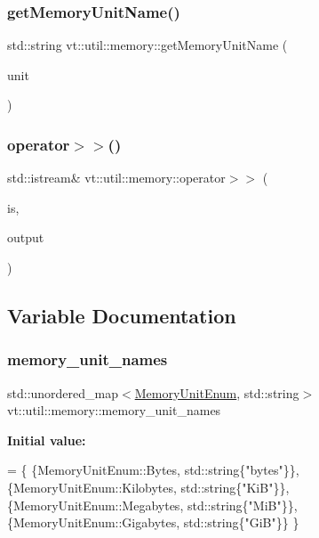 \subsubsection{\texorpdfstring{get\+Memory\+Unit\+Name()}{getMemoryUnitName()}}
{\footnotesize\ttfamily std\+::string vt\+::util\+::memory\+::get\+Memory\+Unit\+Name (\begin{DoxyParamCaption}\item[{\hyperlink{namespacevt_1_1util_1_1memory_a64df3d84293b34009f78e2a1db2f9bb6}{Memory\+Unit\+Enum}}]{unit }\end{DoxyParamCaption})}

\mbox{\label{namespacevt_1_1util_1_1memory_afe1acbbca9aa1bd7310548cefd40045c}} 
\subsubsection{\texorpdfstring{operator$>$$>$()}{operator>>()}}
{\footnotesize\ttfamily std\+::istream\& vt\+::util\+::memory\+::operator$>$$>$ (\begin{DoxyParamCaption}\item[{std\+::istream \&}]{is,  }\item[{\hyperlink{structvt_1_1util_1_1memory_1_1_comma_delimit}{Comma\+Delimit} \&}]{output }\end{DoxyParamCaption})}



\subsection{Variable Documentation}
\mbox{\label{namespacevt_1_1util_1_1memory_aa772e07fd4860ed4086654c53eed51c2}} 
\subsubsection{\texorpdfstring{memory\+\_\+unit\+\_\+names}{memory\_unit\_names}}
{\footnotesize\ttfamily std\+::unordered\+\_\+map$<$\hyperlink{namespacevt_1_1util_1_1memory_a64df3d84293b34009f78e2a1db2f9bb6}{Memory\+Unit\+Enum}, std\+::string$>$ vt\+::util\+::memory\+::memory\+\_\+unit\+\_\+names}

{\bfseries Initial value\+:}
\begin{DoxyCode}
= \{
  \{MemoryUnitEnum::Bytes,     std::string\{\textcolor{stringliteral}{"bytes"}\}\},
  \{MemoryUnitEnum::Kilobytes, std::string\{\textcolor{stringliteral}{"KiB"}\}\},
  \{MemoryUnitEnum::Megabytes, std::string\{\textcolor{stringliteral}{"MiB"}\}\},
  \{MemoryUnitEnum::Gigabytes, std::string\{\textcolor{stringliteral}{"GiB"}\}\}
\}
\end{DoxyCode}
